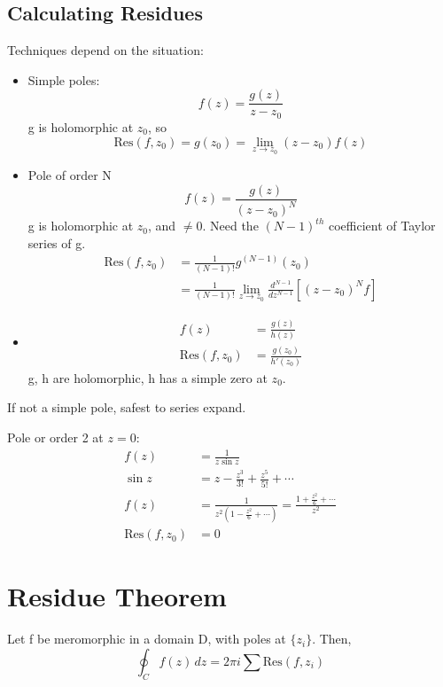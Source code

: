 \documentclass[a4paper, 11pt, normalem]{report}
\begin{document}
\subsection{Calculating Residues}
Techniques depend on the situation:
\begin{itemize}
    \item Simple poles:
        \begin{equation}
            f(z) = \frac{g(z)}{z-z_0}
        \end{equation}
        g is holomorphic at $z_0$, so
        \begin{equation}
            \text{Res}(f,z_0) = g(z_0) = \lim_{z\to z_0} (z-z_0)f(z)
        \end{equation}
    \item Pole of order N
        \begin{equation}
            f(z) = \frac{g(z)}{(z-z_0)^N}
        \end{equation}
        g is holomorphic at $z_0$, and $\neq 0$.
        Need the $(N-1)^{th}$ coefficient of Taylor series of g.
        \begin{align}
            \text{Res}(f,z_0) &= \frac{1}{(N-1)!} g^{(N-1)}(z_0) \\
                              &= \frac{1}{(N-1)!} \lim_{z\to z_0} \frac{d^{N-1}}{dz^{N-1}} \left[(z-z_0)^Nf\right]
        \end{align}
    \item
        \begin{align}
            f(z) &= \frac{g(z)}{h(z)} \\
            \text{Res}(f,z_0) &= \frac{g(z_0)}{h'(z_0)}
        \end{align}
        g, h are holomorphic, h has a simple zero at $z_0$.
\end{itemize}
If not a simple pole, safest to series expand.
\begin{example}
    Pole or order 2 at $z=0$:
    \begin{align}
        f(z) &= \frac{1}{z\sin z} \\
        \sin z &= z - \frac{z^3}{3!} + \frac{z^5}{5!} + \cdots \\
        f(z) &= \frac{1}{z^2(1 - \frac{z^2}{6} + \cdots)} = \frac{1 + \frac{z^2}{6} + \cdots}{z^2} \\
        \text{Res}(f,z_0) &= 0
    \end{align}
\end{example}

\section{Residue Theorem}
Let f be meromorphic in a domain D, with poles at $\{z_i\}$.
Then,
\begin{equation}
    \oint_C f(z)\,dz = 2\pi i \sum \text{Res}(f,z_i)
\end{equation}
\end{document}
